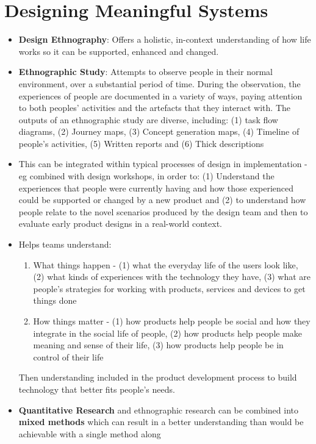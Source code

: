 \documentclass{article}
\begin{document}
\section{Designing Meaningful Systems}
\begin{itemize}
    \item \textbf{Design Ethnography}: Offers a holistic, in-context understanding of how life works so it can be supported, enhanced and changed.
    
    \item \textbf{Ethnographic Study}: Attempts to observe people in their normal environment, over a substantial period of time. During the observation, the experiences of people are documented in a variety of ways, paying attention to both peoples' activities and the artefacts that they interact with. The outputs of an ethnographic study are diverse, including: (1) task flow diagrams, (2) Journey maps, (3) Concept generation maps, (4) Timeline of people's activities, (5) Written reports and (6) Thick descriptions
    
    \item This can be integrated within typical processes of design in implementation - eg combined with design workshops, in order to: (1) Understand the experiences that people were currently having and how those experienced could be supported or changed by a new product and (2) to understand how people relate to the novel scenarios produced by the design team and then to evaluate early product designs in a real-world context.
    
    \item Helps teams understand:
    \begin{enumerate}
        \item What things happen - (1) what the everyday life of the users look like, (2) what kinds of experiences with the technology they have, (3) what are people's strategies for working with products, services and devices to get things done
        \item How things matter - (1) how products help people be social and how they integrate in the social life of people, (2) how products help people make meaning and sense of their life, (3) how products help people be in control of their life
    \end{enumerate}
    
    Then understanding included in the product development process to build technology that better fits people's needs.
    
    \item \textbf{Quantitative Research} and ethnographic research can be combined into \textbf{mixed methods} which can result in a better understanding than would be achievable with a single method along
\end{itemize}
\end{document}
